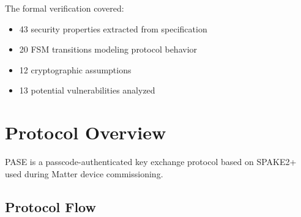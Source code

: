 \documentclass[11pt,a4paper]{article}
\begin{document}
The formal verification covered:
\begin{itemize}
    \item 43 security properties extracted from specification
    \item 20 FSM transitions modeling protocol behavior
    \item 12 cryptographic assumptions
    \item 13 potential vulnerabilities analyzed
\end{itemize}

\section{Protocol Overview}

PASE is a passcode-authenticated key exchange protocol based on SPAKE2+ used during Matter device commissioning.

\subsection{Protocol Flow}
\end{document}
